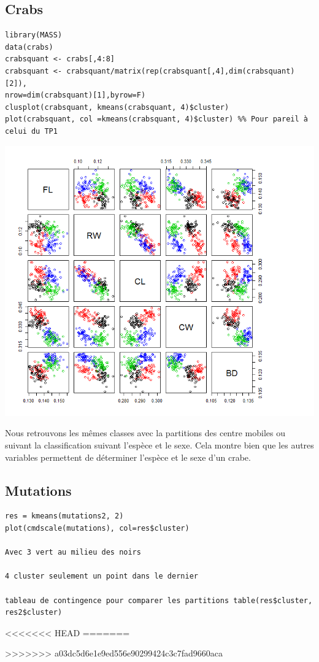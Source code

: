 \documentclass{article}\usepackage[]{graphicx}\usepackage[]{color}
\begin{document}
\subsection*{Crabs}
\begin{verbatim}
library(MASS)
data(crabs)
crabsquant <- crabs[,4:8]
crabsquant <- crabsquant/matrix(rep(crabsquant[,4],dim(crabsquant)[2]),
nrow=dim(crabsquant)[1],byrow=F)
clusplot(crabsquant, kmeans(crabsquant, 4)$cluster)
plot(crabsquant, col =kmeans(crabsquant, 4)$cluster) %% Pour pareil à celui du TP1
\end{verbatim}
\includegraphics[width=\textwidth]{ex2.png}



Nous retrouvons les mêmes classes avec la partitions des centre mobiles ou suivant la classification suivant l'espèce et le sexe. Cela montre bien que les autres variables permettent de déterminer l'espèce et le sexe d'un crabe. 

\subsection*{Mutations}
\begin{verbatim}
res = kmeans(mutations2, 2)
plot(cmdscale(mutations), col=res$cluster)

Avec 3 vert au milieu des noirs 

4 cluster seulement un point dans le dernier

tableau de contingence pour comparer les partitions table(res$cluster, res2$cluster)
\end{verbatim}


<<<<<<< HEAD
=======

>>>>>>> a03dc5d6e1e9ed556e90299424c3c7fad9660aca
\end{document}

